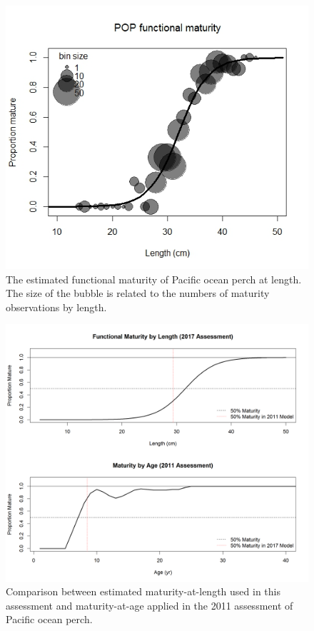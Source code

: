 \documentclass[12pt,]{article}
\begin{document}
\begin{figure}
\centering
\includegraphics{Figures/Functional_Maturity.png}
\caption{The estimated functional maturity of Pacific ocean perch at
length. The size of the bubble is related to the numbers of maturity
observations by length. \label{fig:mat}}
\end{figure}

\begin{figure}
\centering
\includegraphics{Figures/Maturity_Comparison.png}
\caption{Comparison between estimated maturity-at-length used in this
assessment and maturity-at-age applied in the 2011 assessment of Pacific
ocean perch. \label{fig:mat_compare}}
\end{figure}
\end{document}
